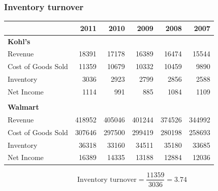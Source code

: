 \documentclass[10pt,handout,notes=show]{beamer}
\begin{document}
  \begin{frame}
  \frametitle{Inventory turnover}

  \begin{center}\small{
    \begin{tabular}{lrrrrr}\hline
      	                  & 2011	& 2010	& 2009	& 2008	& 2007 \\ \hline
      \textbf{Kohl's} \\
      Revenue	            & 18391	& 17178	& 16389	& 16474	& 15544 \\
      Cost of Goods Sold	& 11359	& 10679	& 10332	& 10459	& 9890\\
      Inventory	          & 3036	& 2923	& 2799	& 2856	& 2588 \\
      Net Income	        & 1114	& 991	& 885	& 1084	& 1109 \\ \hline
      	& 	& 	& 	& 	& \\
      \textbf{Walmart} \\
      Revenue	            & 418952	& 405046	& 401244	& 374526	& 344992\\
      Cost of Goods Sold	& 307646	& 297500	& 299419	& 280198	& 258693\\
      Inventory	          & 36318	  & 33160	  & 34511	& 35180	& 33685 \\
      Net Income	        & 16389	  & 14335	  & 13188	& 12884	& 12036 \\ \hline
    \end{tabular} }
  \end{center}

  \[
  \mbox{Inventory turnover} = \frac{11359}{3036} = 3.74
  \]
  \end{frame}

\end{document}
